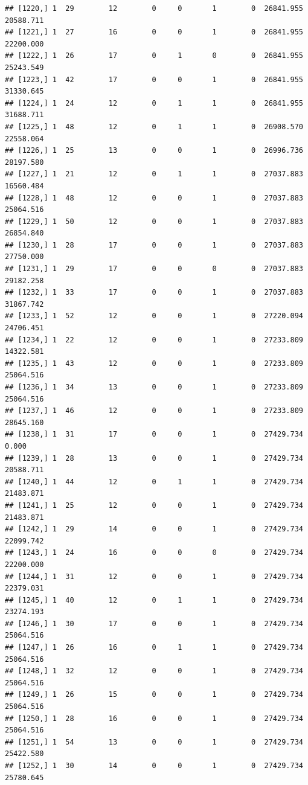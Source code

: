 \documentclass[
]{article}
\begin{document}
\begin{verbatim}
## [1220,] 1  29        12        0     0       1        0  26841.955  20588.711
## [1221,] 1  27        16        0     0       1        0  26841.955  22200.000
## [1222,] 1  26        17        0     1       0        0  26841.955  25243.549
## [1223,] 1  42        17        0     0       1        0  26841.955  31330.645
## [1224,] 1  24        12        0     1       1        0  26841.955  31688.711
## [1225,] 1  48        12        0     1       1        0  26908.570  22558.064
## [1226,] 1  25        13        0     0       1        0  26996.736  28197.580
## [1227,] 1  21        12        0     1       1        0  27037.883  16560.484
## [1228,] 1  48        12        0     0       1        0  27037.883  25064.516
## [1229,] 1  50        12        0     0       1        0  27037.883  26854.840
## [1230,] 1  28        17        0     0       1        0  27037.883  27750.000
## [1231,] 1  29        17        0     0       0        0  27037.883  29182.258
## [1232,] 1  33        17        0     0       1        0  27037.883  31867.742
## [1233,] 1  52        12        0     0       1        0  27220.094  24706.451
## [1234,] 1  22        12        0     0       1        0  27233.809  14322.581
## [1235,] 1  43        12        0     0       1        0  27233.809  25064.516
## [1236,] 1  34        13        0     0       1        0  27233.809  25064.516
## [1237,] 1  46        12        0     0       1        0  27233.809  28645.160
## [1238,] 1  31        17        0     0       1        0  27429.734      0.000
## [1239,] 1  28        13        0     0       1        0  27429.734  20588.711
## [1240,] 1  44        12        0     1       1        0  27429.734  21483.871
## [1241,] 1  25        12        0     0       1        0  27429.734  21483.871
## [1242,] 1  29        14        0     0       1        0  27429.734  22099.742
## [1243,] 1  24        16        0     0       0        0  27429.734  22200.000
## [1244,] 1  31        12        0     0       1        0  27429.734  22379.031
## [1245,] 1  40        12        0     1       1        0  27429.734  23274.193
## [1246,] 1  30        17        0     0       1        0  27429.734  25064.516
## [1247,] 1  26        16        0     1       1        0  27429.734  25064.516
## [1248,] 1  32        12        0     0       1        0  27429.734  25064.516
## [1249,] 1  26        15        0     0       1        0  27429.734  25064.516
## [1250,] 1  28        16        0     0       1        0  27429.734  25064.516
## [1251,] 1  54        13        0     0       1        0  27429.734  25422.580
## [1252,] 1  30        14        0     0       1        0  27429.734  25780.645

\end{verbatim}
\end{document}
